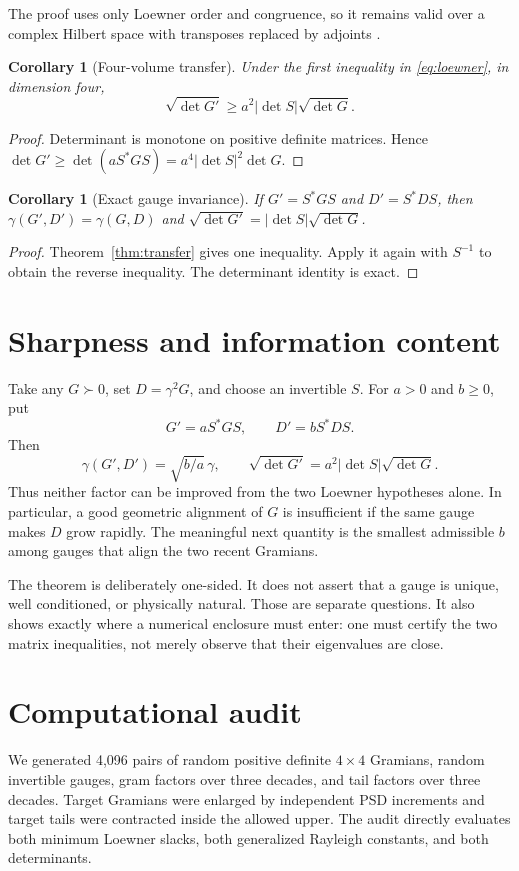 \documentclass[12pt]{article}
\newtheorem{corollary}[theorem]{Corollary}
\begin{document}
The proof uses only Loewner order and congruence, so it remains valid over a
complex Hilbert space with transposes replaced by adjoints
\citep{Bhatia2007,HornJohnson1991}.

\begin{corollary}[Four-volume transfer]\label{cor:volume}
Under the first inequality in \eqref{eq:loewner}, in dimension four,
\begin{equation}\label{eq:volume}
 \sqrt{\det G'}\geq a^2|\det S|\sqrt{\det G}.
\end{equation}
\end{corollary}
\begin{proof}
Determinant is monotone on positive definite matrices.  Hence
$\det G'\geq\det(aS^*GS)=a^4|\det S|^2\det G$.
\end{proof}

\begin{corollary}[Exact gauge invariance]
If $G'=S^*GS$ and $D'=S^*DS$, then
$\gamma(G',D')=\gamma(G,D)$ and
$\sqrt{\det G'}=|\det S|\sqrt{\det G}$.
\end{corollary}
\begin{proof}
Theorem~\ref{thm:transfer} gives one inequality.  Apply it again with
$S^{-1}$ to obtain the reverse inequality.  The determinant identity is
exact.
\end{proof}

\section{Sharpness and information content}
Take any $G\succ0$, set $D=\gamma^2G$, and choose an invertible $S$.  For
$a>0$ and $b\geq0$, put
\[
 G'=aS^*GS,\qquad D'=bS^*DS.
\]
Then
\[
 \gamma(G',D')=\sqrt{b/a}\,\gamma,
 \qquad
 \sqrt{\det G'}=a^2|\det S|\sqrt{\det G}.
\]
Thus neither factor can be improved from the two Loewner hypotheses alone.
In particular, a good geometric alignment of $G$ is insufficient if the
same gauge makes $D$ grow rapidly.  The meaningful next quantity is the
smallest admissible $b$ among gauges that align the two recent Gramians.

The theorem is deliberately one-sided.  It does not assert that a gauge is
unique, well conditioned, or physically natural.  Those are separate
questions.  It also shows exactly where a numerical enclosure must enter:
one must certify the two matrix inequalities, not merely observe that their
eigenvalues are close.

\section{Computational audit}
We generated 4,096 pairs of random positive definite $4\times4$ Gramians,
random invertible gauges, gram factors over three decades, and tail factors
over three decades.  Target Gramians were enlarged by independent PSD
increments and target tails were contracted inside the allowed upper.  The
audit directly evaluates both minimum Loewner slacks, both generalized
Rayleigh constants, and both determinants.
\end{document}
